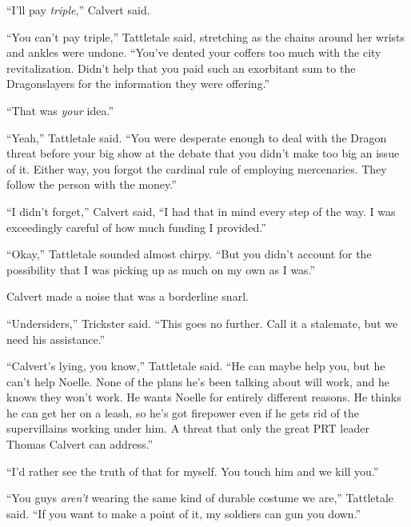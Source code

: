 ``I'll pay \emph{triple},'' Calvert said.



``You can't pay triple,'' Tattletale said, stretching as the chains around her wrists and ankles were undone.  ``You've dented your coffers too much with the city revitalization.  Didn't help that you paid such an exorbitant sum to the Dragonslayers for the information they were offering.''



``That was \emph{your} idea.''



``Yeah,'' Tattletale said.  ``You were desperate enough to deal with the Dragon threat before your big show at the debate that you didn't make too big an issue of it.  Either way, you forgot the cardinal rule of employing mercenaries.  They follow the person with the money.''



``I didn't forget,'' Calvert said, ``I had that in mind every step of the way.  I was exceedingly careful of how much funding I provided.''



``Okay,'' Tattletale sounded almost chirpy.  ``But you didn't account for the possibility that I was picking up as much on my own as I was.''



Calvert made a noise that was a borderline snarl.



``Undersiders,'' Trickster said.  ``This goes no further.  Call it a stalemate, but we need his assistance.''



``Calvert's lying, you know,'' Tattletale said.  ``He can maybe help you, but he can't help Noelle.  None of the plans he's been talking about will work, and he knows they won't work.  He wants Noelle for entirely different reasons.  He thinks he can get her on a leash, so he's got firepower even if he gets rid of the supervillains working under him.  A threat that only the great PRT leader Thomas Calvert can address.''



``I'd rather see the truth of that for myself.  You touch him and we kill you.''



``You guys \emph{aren't} wearing the same kind of durable costume we are,'' Tattletale said.  ``If you want to make a point of it, my soldiers can gun you down.''




